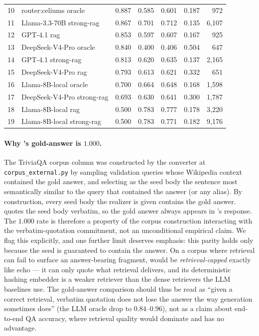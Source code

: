 \begin{table}[tb]
\begin{tabular}{rl rrrr r}
10 & router:celiums oracle                & 0.887 & 0.585 & 0.601 & 0.187 & 972 \\
11 & Llama-3.3-70B strong-rag             & 0.867 & 0.701 & 0.712 & 0.135 & 6{,}107 \\
12 & GPT-4.1 rag                          & 0.853 & 0.597 & 0.607 & 0.167 & 925 \\
13 & DeepSeek-V4-Pro oracle               & 0.840 & 0.400 & 0.406 & 0.504 & 647 \\
14 & GPT-4.1 strong-rag                   & 0.813 & 0.620 & 0.635 & 0.137 & 2{,}165 \\
15 & DeepSeek-V4-Pro rag                  & 0.793 & 0.613 & 0.621 & 0.332 & 651 \\
16 & Llama-8B-local oracle                & 0.700 & 0.664 & 0.648 & 0.168 & 1{,}598 \\
17 & DeepSeek-V4-Pro strong-rag           & 0.693 & 0.630 & 0.641 & 0.300 & 1{,}787 \\
18 & Llama-8B-local rag                   & 0.500 & 0.783 & 0.777 & 0.178 & 3{,}220 \\
19 & Llama-8B-local strong-rag            & 0.500 & 0.783 & 0.771 & 0.182 & 9{,}176 \\
\bottomrule
\end{tabular}
\end{table}

\paragraph{Why \hyphae{}'s gold-answer is $1.000$.}
The TriviaQA corpus column was constructed by the converter at
\texttt{corpus\_external.py} by sampling validation queries whose
Wikipedia context contained the gold answer, and selecting as the
seed body the sentence most semantically similar to the query that
contained the answer (or any alias). By construction, every seed
body the realizer is given contains the gold answer. \hyphae{}
quotes the seed body verbatim, so the gold answer always appears
in \hyphae{}'s response. The $1.000$ rate is therefore a property
of the corpus construction interacting with the verbatim-quotation
commitment, not an unconditional empirical claim. We flag this
explicitly, and one further limit deserves emphasis: this parity
holds only because the seed is guaranteed to contain the answer.
On a corpus where retrieval can fail to surface an answer-bearing
fragment, \hyphae{} would be \emph{retrieval-capped} exactly like
echo --- it can only quote what retrieval delivers, and its
deterministic hashing embedder is a weaker retriever than the
dense retrievers the LLM baselines use. The gold-answer comparison
should thus be read as ``given a correct retrieval, verbatim
quotation does not lose the answer the way generation sometimes
does'' (the LLM oracle drop to $0.84$--$0.96$), not as a claim
about end-to-end QA accuracy, where retrieval quality would
dominate and \hyphae{} has no advantage.

